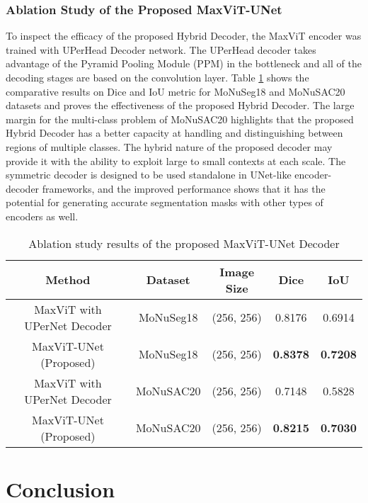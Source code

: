 \documentclass{article}
\begin{document}
\subsubsection{Ablation Study of the Proposed MaxViT-UNet}\label{Ablation Study of the Proposed MaxViT-UNet}

To inspect the efficacy of the proposed Hybrid Decoder, the MaxViT encoder was trained with UPerHead Decoder \cite{xiao2018unified} network. The UPerHead decoder takes advantage of the Pyramid Pooling Module (PPM) \cite{zhao2017pyramid} in the bottleneck and all of the decoding stages are based on the convolution layer. Table \ref{table:ablation-decoder} shows the comparative results on Dice and IoU metric for MoNuSeg18 and MoNuSAC20 datasets and proves the effectiveness of the proposed Hybrid Decoder. The large margin for the multi-class problem of MoNuSAC20 highlights that the proposed Hybrid Decoder has a better capacity at handling and distinguishing between regions of multiple classes. The hybrid nature of the proposed decoder may provide it with the ability to exploit large to small contexts at each scale. The symmetric decoder is designed to be used standalone in UNet-like encoder-decoder frameworks, and the improved performance shows that it has the potential for generating accurate segmentation masks with other types of encoders as well.

\begin{table}[ht!]
  \centering
  \caption{Ablation study results of the proposed MaxViT-UNet Decoder}\label{table:ablation-decoder}
  \begin{tabular*}{\textwidth}{@{\extracolsep\fill}ccccc}
    \toprule Method & Dataset & Image Size & Dice & IoU \\
    \midrule
      MaxViT with UPerNet Decoder & MoNuSeg18 & (256, 256) & 0.8176 & 0.6914 \\
      MaxViT-UNet (Proposed) & MoNuSeg18 & (256, 256) & \textbf{0.8378} & \textbf{0.7208} \\
    \midrule
      MaxViT with UPerNet Decoder & MoNuSAC20 & (256, 256) & 0.7148 & 0.5828 \\
      MaxViT-UNet (Proposed) & MoNuSAC20 & (256, 256) & \textbf{0.8215} & \textbf{0.7030} \\
    \hline
  \end{tabular*}
\end{table}

\section{Conclusion}\label{Conclusion}
\end{document}
